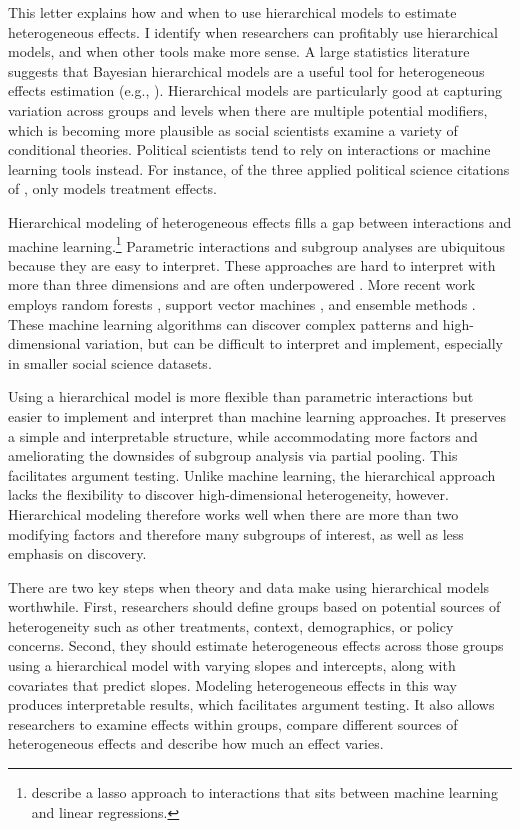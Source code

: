\documentclass[12pt]{article}
\begin{document}
This letter explains how and when to use hierarchical models to estimate heterogeneous effects. 
I identify when researchers can profitably use hierarchical models, and when other tools make more sense. 
A large statistics literature suggests that Bayesian hierarchical models are a useful tool for  heterogeneous effects estimation (e.g., \cite{FellerGelman2015, McElreath2016, Dorieetal2022}).
Hierarchical models are particularly good at capturing variation across groups and levels when there are multiple potential modifiers, which is becoming more plausible as social scientists examine a variety of conditional theories. %
Political scientists tend to rely on interactions or machine learning tools instead. 
For instance, of the three applied political science citations of \citet{FellerGelman2015}, only \citet{Marquardt2022} models treatment effects. 


Hierarchical modeling of heterogeneous effects fills a gap between interactions and machine learning.\footnote{\citet{BlackwellOlson2022} describe a lasso approach to interactions that sits between machine learning and linear regressions.}
Parametric interactions and subgroup analyses are ubiquitous because they are easy to interpret.
These approaches are hard to interpret with more than three dimensions and are often underpowered \citep{Simmonsetal2011}.
More recent work employs random forests \citep{GreenKern2012, WagerAthey2018}, support vector machines \citep{ImaiRatkovic2013}, and ensemble methods \citep{Grimmeretal2017, Kuenzeletal2019, Dorieetal2022}.
These machine learning algorithms can discover complex patterns and high-dimensional variation, but can be difficult to interpret and implement, especially in smaller social science datasets.

 
Using a hierarchical model is more flexible than parametric interactions but easier to implement and interpret than machine learning approaches.  
It preserves a simple and interpretable structure, while accommodating more factors and ameliorating the downsides of subgroup analysis via partial pooling. 
This facilitates argument testing.
Unlike machine learning, the hierarchical approach lacks the flexibility to discover high-dimensional heterogeneity, however.  
Hierarchical modeling therefore works well when there are more than two modifying factors and therefore many subgroups of interest, as well as less emphasis on discovery. 


There are two key steps when theory and data make using hierarchical models worthwhile.
First, researchers should define groups based on potential sources of heterogeneity such as other treatments, context, demographics, or policy concerns. 
Second, they should estimate heterogeneous effects across those groups using a hierarchical model with varying slopes and intercepts, along with covariates that predict slopes.
Modeling heterogeneous effects in this way produces interpretable results, which facilitates argument testing.
It also allows researchers to examine effects within groups, compare different sources of heterogeneous effects and describe how much an effect varies.  
\end{document}
